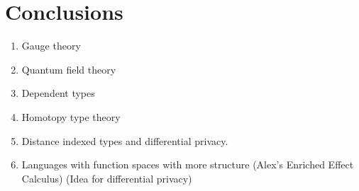 \documentclass[preprint]{sigplanconf}
\theoremstyle{examplestyle}
\begin{document}




\section{Conclusions}
\label{sec:conclusions}

\begin{enumerate}
\item Gauge theory
\item Quantum field theory
\item Dependent types
\item Homotopy type theory
\item Distance indexed types and differential privacy.
\item Languages with function spaces with more structure (Alex's
  Enriched Effect Calculus) (Idea for differential privacy)
\end{enumerate}
\end{document}
